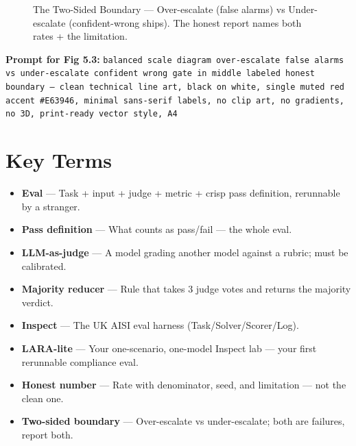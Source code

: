 \begin{figure}[htbp]
\centering
{}
\caption{The Two-Sided Boundary — Over-escalate (false alarms) vs Under-escalate (confident-wrong ships). The honest report names both rates + the limitation.}
\label{fig:5-3}
\end{figure}
\textbf{Prompt for Fig 5.3:} \texttt{balanced scale diagram over-escalate false alarms vs under-escalate confident wrong gate in middle labeled honest boundary — clean technical line art, black on white, single muted red accent \#E63946, minimal sans-serif labels, no clip art, no gradients, no 3D, print-ready vector style, A4}

\section{Key Terms}
\begin{itemize}
\item \textbf{Eval} — Task + input + judge + metric + crisp pass definition, rerunnable by a stranger.
\item \textbf{Pass definition} — What counts as pass/fail — the whole eval.
\item \textbf{LLM-as-judge} — A model grading another model against a rubric; must be calibrated.
\item \textbf{Majority reducer} — Rule that takes 3 judge votes and returns the majority verdict.
\item \textbf{Inspect} — The UK AISI eval harness (Task/Solver/Scorer/Log).
\item \textbf{LARA-lite} — Your one-scenario, one-model Inspect lab — your first rerunnable compliance eval.
\item \textbf{Honest number} — Rate with denominator, seed, and limitation — not the clean one.
\item \textbf{Two-sided boundary} — Over-escalate vs under-escalate; both are failures, report both.
\end{itemize}

